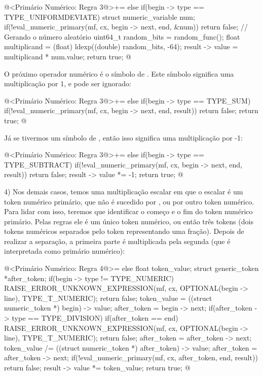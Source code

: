 \iniciocodigo
@<Primário Numérico: Regra 3@>+=
else if(begin -> type == TYPE_UNIFORMDEVIATE){
  struct numeric_variable num;
  if(!eval_numeric_primary(mf, cx, begin -> next, end, &num))
    return false;
  { // Gerando o número aleatório
    uint64_t random_bits = random_func();
    float multiplicand = (float) ldexp((double) random_bits, -64);
    result -> value = multiplicand * num.value;
  }
  return true;
}
@
\fimcodigo

O próximo operador numérico é o símbolo de \monoespaco{+}. Este
símbolo significa uma multiplicação por 1, e pode ser ignorado:

\iniciocodigo
@<Primário Numérico: Regra 3@>+=
else if(begin -> type == TYPE_SUM){
  if(!eval_numeric_primary(mf, cx, begin -> next, end, result))
    return false;
  return true;
}
@
\fimcodigo

Já se tivermos um símbolo de \monoespaco{-}, então isso significa uma
multiplicação por -1:

\iniciocodigo
@<Primário Numérico: Regra 3@>+=
else if(begin -> type == TYPE_SUBTRACT){
  if(!eval_numeric_primary(mf, cx, begin -> next, end, result))
    return false;
  result -> value *= -1;
  return true;
}
@
\fimcodigo


4) Nos demais casos, temos uma multiplicação escalar em que o escalar
é um token numérico primário, que não é sucedido
por \monoespaco{+}, \monoespaco{-} ou por outro token numérico. Para
lidar com isso, teremos que identificar o começo e o fim do token
numérico primário. Pelas regras ele é um único token numérico, ou
então três tokens (dois tokens numéricos separados pelo
token \monoespaco{/} representando uma fração). Depois de realizar a
separação, a primeira parte é multiplicada pela segunda (que é
interpretada como primário numérico):

\iniciocodigo
@<Primário Numérico: Regra 4@>=
else{
  float token_value;
  struct generic_token *after_token;
  if(begin -> type != TYPE_NUMERIC){
    RAISE_ERROR_UNKNOWN_EXPRESSION(mf, cx, OPTIONAL(begin -> line),
                                   TYPE_T_NUMERIC);
    return false;
  }
  token_value = ((struct numeric_token *) begin) -> value;
  after_token = begin -> next;
  if(after_token -> type == TYPE_DIVISION){
    if(after_token == end){
      RAISE_ERROR_UNKNOWN_EXPRESSION(mf, cx, OPTIONAL(begin -> line),
                                     TYPE_T_NUMERIC);
      return false;
    }
    after_token = after_token -> next;
    token_value /= ((struct numeric_token *) after_token) -> value;
    after_token = after_token -> next;
  }
  if(!eval_numeric_primary(mf, cx, after_token, end, result))
    return false;
  result -> value *= token_value;
  return true;
}
@
\fimcodigo

